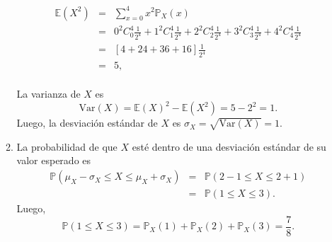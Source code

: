 \documentclass[a4paper,9pt]{report}
\begin{document}
\begin{enumerate}
\begin{enumerate}
	\begin{eqnarray*}
		\mathbb{E}(X^2)&=&\displaystyle \sum_{x=0}^{4}x^2\mathbb{P}_X(x)\\
		&=&0^2C_0^4\frac{1}{2^4}+1^2C_1^4\frac{1}{2^4}+2^2C_2^4\frac{1}{2^4}+3^2C_3^4\frac{1}{2^4}+4^2C_4^4\frac{1}{2^4}\\
		&=&[4+24+36+16]\frac{1}{2^4}\\
		&=& 5,
	\end{eqnarray*}
	\\
	La varianza de $X$ es 
	$$\text{Var}(X)=\mathbb{E}(X)^2-\mathbb{E}(X^2)=5-2^2=1.$$
	Luego, la desviaci\'on est\'andar de $X$ es $\sigma_X=\sqrt{\text{Var}(X)}=1$.
	\item La probabilidad de que $X$ est\'e dentro de una desviaci\'on est\'andar de su valor esperado es
	\begin{eqnarray*}
		\mathbb{P}(\mu_X-\sigma_X\leq X \leq \mu_X+\sigma_X)	&=& \mathbb{P}(2-1\leq X \leq 2+1)\\
		&=& \mathbb{P}(1\leq X \leq 3).
	\end{eqnarray*}
	Luego, 
	$$\mathbb{P}(1\leq X \leq 3) = \mathbb{P}_X(1)+\mathbb{P}_X(2)+\mathbb{P}_X(3)=\frac{7}{8}.$$
\end{enumerate}


\end{enumerate}
\end{document}
